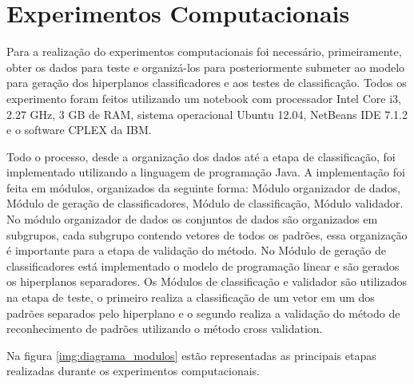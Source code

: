 \chapter{Experimentos Computacionais}
Para a realização do experimentos computacionais foi necessário, primeiramente, obter os dados para teste e organizá-los para posteriormente submeter ao modelo para geração dos hiperplanos classificadores  e aos testes de classificação. Todos os experimento foram feitos utilizando um notebook com processador Intel Core i3, 2.27 GHz, 3 GB de RAM, sistema operacional Ubuntu 12.04, NetBeans IDE 7.1.2 e o software CPLEX da IBM.

Todo o processo, desde a organização dos dados até a etapa de classificação, foi implementado utilizando a linguagem de programação Java. A implementação foi feita em módulos, organizados da seguinte forma: Módulo organizador de dados, Módulo de geração de classificadores, Módulo de classificação, Módulo validador. No módulo organizador de dados os conjuntos de dados são organizados em subgrupos, cada subgrupo contendo vetores de todos os padrões, essa organização é importante para a etapa de validação do método. No Módulo de geração de classificadores está implementado o modelo de programação linear e são gerados os hiperplanos separadores. Os Módulos de classificação e validador são utilizados na etapa de teste, o primeiro realiza a classificação de um vetor em um dos padrões separados pelo hiperplano e o segundo realiza a validação do método de reconhecimento de padrões utilizando o método cross validation.

Na figura \ref{img:diagrama_modulos} estão representadas as principais etapas realizadas durante os experimentos computacionais.


